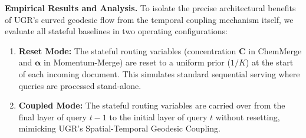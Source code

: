 \textbf{Empirical Results and Analysis.} To isolate the precise architectural benefits of UGR's curved geodesic flow from the temporal coupling mechanism itself, we evaluate all stateful baselines in two operating configurations:
\begin{enumerate}
    \item \textbf{Reset Mode:} The stateful routing variables (concentration $\mathbf{C}$ in ChemMerge and $\boldsymbol{\alpha}$ in Momentum-Merge) are reset to a uniform prior ($1/K$) at the start of each incoming document. This simulates standard sequential serving where queries are processed stand-alone.
    \item \textbf{Coupled Mode:} The stateful routing variables are carried over from the final layer of query $t-1$ to the initial layer of query $t$ without resetting, mimicking UGR's Spatial-Temporal Geodesic Coupling.
\end{enumerate}


